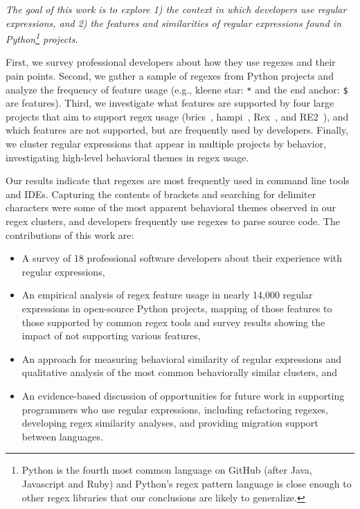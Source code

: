 \emph{The goal of this work is to explore 1) the context in which developers use regular expressions, and 2) the features and similarities of  regular expressions found in Python\footnote{Python is the fourth most common language on GitHub (after Java, Javascript and Ruby) and  Python's regex pattern language is close enough to other regex libraries that our conclusions are likely to generalize.} projects}.

First, we survey professional developers about how they use regexes and their pain points.  Second, we gather a sample of regexes from Python projects and analyze the frequency of feature usage (e.g., kleene star: \verb!*! and the end anchor: \verb!$! are features).    Third, we investigate what features are supported by four large projects that aim to support regex usage (brics~\cite{brics}, hampi~\cite{hampi}, Rex~\cite{rex}, and RE2~\cite{re2}), and which features are not supported, but are frequently used by developers.  Finally, we cluster regular expressions that appear in multiple projects by behavior, investigating high-level behavioral themes in regex usage.

Our results indicate that regexes are most frequently used in command line tools and IDEs.    Capturing the contents of brackets and searching for delimiter characters were some of the most apparent  behavioral themes observed in our regex clusters, and developers frequently use regexes to parse source code.
The contributions of this work are:
\begin{itemize} \setlength \itemsep{.1pt}
    \item A survey of 18 professional software developers about their experience with regular expressions,
	\item An empirical analysis of regex feature usage in nearly 14,000 regular expressions in  open-source Python projects, mapping of those features to those supported by common regex tools and survey results showing the impact of not supporting various features,
	\item An approach for measuring behavioral similarity of regular expressions and qualitative analysis of the most common behaviorally similar clusters, and
	\item An evidence-based discussion of opportunities for future work in supporting programmers who use regular expressions, including refactoring regexes, developing regex similarity analyses, and providing migration support between languages.
\end{itemize}
